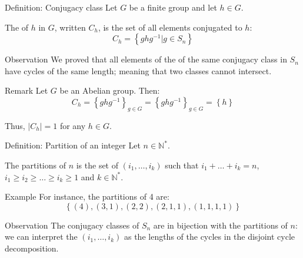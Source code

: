 \documentclass[a4paper]{article}
\begin{document}
\begin{parag}{Definition: Conjugacy class}
    Let $G$ be a finite group and let $h \in G$.

    The  of $h$ in $G$, written $C_h$, is the set of all elements conjugated to $h$: 
    \[C_h = \left\{ghg^{-1} | g \in S_n\right\}\]
    
    \begin{subparag}{Observation}
        We proved that all elements of the of the same conjugacy class in $S_n$ have cycles of the same length; meaning that two classes cannot intersect.
    \end{subparag}
    
    \begin{subparag}{Remark}
        Let $G$ be an Abelian group. Then: 
        \[C_h = \left\{g h g^{-1}\right\}_{g \in G} = \left\{g h g^{-1}\right\}_{g \in G} = \left\{h\right\}\]
        
        Thus, $\left|C_h\right| = 1$ for any $h \in G$.
    \end{subparag}
\end{parag}

\begin{parag}{Definition: Partition of an integer}
    Let $n \in \mathbb{N}^*$.

    The partitions of $n$ is the set of $\left(i_1, \ldots, i_k\right)$ such that $i_1 + \ldots + i_k = n$, $i_1 \geq i_2 \geq \ldots \geq i_k \geq 1$ and $k \in \mathbb{N}^*$.

    \begin{subparag}{Example}
        For instance, the partitions of 4 are: 
        \[\left\{\left(4\right), \left(3, 1\right), \left(2, 2\right), \left(2, 1, 1\right), \left(1, 1, 1, 1\right)\right\}\]
    \end{subparag}
\end{parag}

\begin{parag}{Observation}
    The conjugacy classes of $S_n$ are in bijection with the partitions of $n$: we can interpret the $\left(i_1, \ldots, i_k\right)$ as the lengths of the cycles in the disjoint cycle decomposition.
\end{parag}
\end{document}

